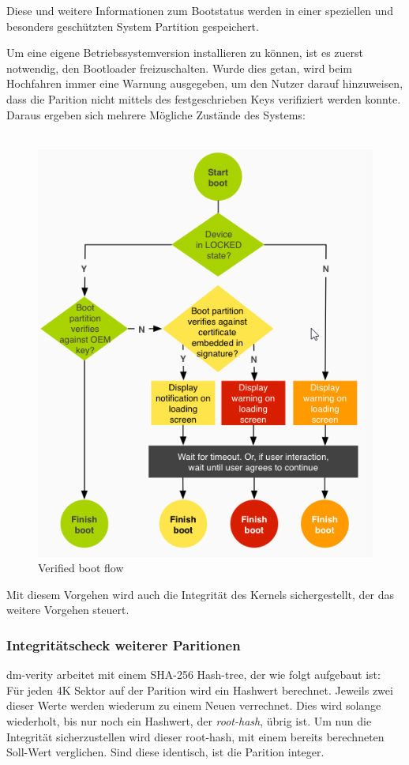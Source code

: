 \begin{flushleft}
	Diese und weitere Informationen zum Bootstatus werden in einer speziellen und besonders geschützten System Partition gespeichert. \\
\end{flushleft}
	Um eine eigene Betriebssystemversion installieren zu können, ist es zuerst notwendig, den Bootloader freizuschalten. Wurde dies getan, wird beim Hochfahren immer eine Warnung ausgegeben, um den Nutzer darauf hinzuweisen, dass die Parition nicht mittels des festgeschrieben Keys verifiziert werden konnte. Daraus ergeben sich mehrere Mögliche Zustände des Systems:\\\\
	
	\begin{figure}[h]
		\centering
		\includegraphics[width=0.7\linewidth, height=0.5\textheight]{android_pages/graphics/VerifiedBoot}
		\caption[Verified boot flow\protect\cite{VerifyingBoot}]{Verified boot flow\protect\cite{VerifyingBoot}}
		\label{fig:VerifiedBoot}
	\end{figure}
	
\begin{flushleft}
	Mit diesem Vorgehen wird auch die Integrität des Kernels sichergestellt, der das weitere Vorgehen steuert.
\end{flushleft}
	
	\subsubsection{Integritätscheck weiterer Paritionen}
	dm-verity arbeitet mit einem SHA-256 Hash-tree, der wie folgt aufgebaut ist:\\
	Für jeden 4K Sektor auf der Parition wird ein Hashwert berechnet. Jeweils zwei dieser Werte werden wiederum zu einem Neuen verrechnet. Dies wird solange wiederholt, bis nur noch ein Hashwert, der \textit{root-hash}, übrig ist. Um nun die Integrität sicherzustellen wird dieser root-hash, mit einem bereits berechneten Soll-Wert verglichen. Sind diese identisch, ist die Parition integer.
	
